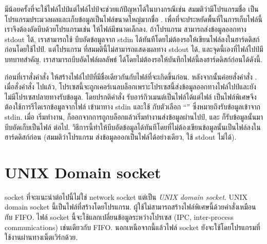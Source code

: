 \begin{thwbr}
มีน้อยครั้งที่จะใช้ไฟล์ไปป์แต่ไฟล์ไปป์จะช่วยแก้ปัญหาได้ในบางกรณีเช่น สมมติว่ามีโปรแกรมชื่อ   เป็นโปรแกรมประมวลผลและเก็บข้อมูลเป็นไฟล์ขนาดใหญ่มากชื่อ . เพื่อที่จะประหยัดพื้นที่ในการเก็บไฟล์นี้เราจึงต้องอัดบีบด้วยโปรแกรมเช่น  ให้ไฟล์มีขนาดเล็กลง. ถ้าโปรแกรม  สามารถส่งข้อมูลออกทาง stdout ได้, เราสามารถใช้  บีบอัดข้อมูลจาก stdin ได้ทันทีโดยไม่ต้องรอให้เขียนไฟล์ลงในฮาร์ดดิสก์ก่อนโดยใช้ไปป์. แต่โปรแกรม  ที่สมมตินี้ไม่สามารถแสดงผลทาง stdout ได้, และจุดนี้เองที่ไฟล์ไปป์มีบทบาทสำคัญ. เราสามารถบีบอัดไฟล์ผลลัพธ์  ได้โดยไม่ต้องรอให้บันทึกไฟล์นี้ลงฮาร์ดดิสก์ก่อนได้ดังนี้.
\begin{MyExample}
\end{MyExample}%
ก่อนที่เราสั่งคำสั่ง  ให้สร้างไฟล์ไปป์ที่มีชื่อเดียวกันกับไฟล์ที่จะเกิดขึ้นก่อน. หลังจากนั้นค่อยสั่งคำสั่ง . เมื่อสั่งคำสั่ง  ไปแล้ว, โปรเซสนี้จะถูกเคอร์เนลบล็อกเพราะโปรเซสนี้ส่งข้อมูลออกทางไฟล์ไปป์และยังไม่มีโปรเซสปลายทางรับข้อมูล. โดยปรกติคำสั่ง  รับอาร์กิวเมนต์เป็นไฟล์ได้แต่ไฟล์  เป็นไฟล์พิเศษจึงต้องใช้การรีไดเรกข้อมูลจากไฟล์  เข้ามาทาง stdin และใช้  กับตัวเลือก ``\cmd{-}'' ซึ่งหมายถึงรับข้อมูลเข้าจาก stdin. เมื่อ  เริ่มทำงาน,  ก็ออกจากการถูกบล็อกแล้วเริ่มทำงานส่งข้อมูลผ่านไปป์, และ  ก็รับข้อมูลนั้นมาบีบอัดเก็บเป็นไฟล์  ต่อไป. วิธีการนี้ทำให้บีบอัดข้อมูลได้ทันทีโดยที่ไม่ต้องเขียนข้อมูลนั้นเป็นไฟล์ลงในฮาร์ดดิสก์ก่อน (สมมติว่าโปรแกรม  ส่งข้อมูลออกเป็นไฟล์ได้อย่างเดียว, ใช้ stdout ไม่ได้).

\section{UNIX Domain socket}
socket ที่จะแนะนำต่อไปนี้ไม่ใช่ network socket แต่เป็น \emph{UNIX domain socket}. UNIX domain socket นี้เป็นไฟล์ที่สร้างโดยโปรแกรม. ผู้ใช้ไม่สามารถสร้างไฟล์พิเศษนี้ด้วยคำสั่งเหมือนกับ FIFO. ไฟล์ socket นี้จะใช้แลกเปลี่ยนข้อมูลระหว่างโปรเซส (IPC, inter-process communications) เช่นเดียวกับ FIFO. นอกเหนือจากนี้แล้วไฟล์ socket ยังจะใช้โดยโปรแกรมที่ใช้งานผ่านทางเน็ตเวิร์กด้วย.


\end{thwbr}
